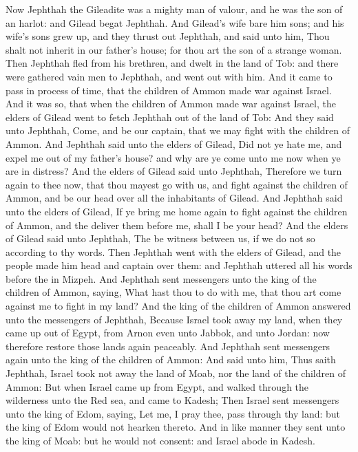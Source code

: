 \begin{biblechapter} %
\verse Now Jephthah the Gileadite was a mighty man of valour, and he was the son of an harlot: and Gilead begat Jephthah.
\verse And Gilead's wife bare him sons; and his wife's sons grew up, and they thrust out Jephthah, and said unto him, Thou shalt not inherit in our father's house; for thou art the son of a strange woman.
\verse Then Jephthah fled from his brethren, and dwelt in the land of Tob: and there were gathered vain men to Jephthah, and went out with him.
\verse And it came to pass in process of time, that the children of Ammon made war against Israel.
\verse And it was so, that when the children of Ammon made war against Israel, the elders of Gilead went to fetch Jephthah out of the land of Tob:
\verse And they said unto Jephthah, Come, and be our captain, that we may fight with the children of Ammon.
\verse And Jephthah said unto the elders of Gilead, Did not ye hate me, and expel me out of my father's house? and why are ye come unto me now when ye are in distress?
\verse And the elders of Gilead said unto Jephthah, Therefore we turn again to thee now, that thou mayest go with us, and fight against the children of Ammon, and be our head over all the inhabitants of Gilead.
\verse And Jephthah said unto the elders of Gilead, If ye bring me home again to fight against the children of Ammon, and the \LORD deliver them before me, shall I be your head?
\verse And the elders of Gilead said unto Jephthah, The \LORD be witness between us, if we do not so according to thy words.
\verse Then Jephthah went with the elders of Gilead, and the people made him head and captain over them: and Jephthah uttered all his words before the \LORD in Mizpeh.
\verse And Jephthah sent messengers unto the king of the children of Ammon, saying, What hast thou to do with me, that thou art come against me to fight in my land?
\verse And the king of the children of Ammon answered unto the messengers of Jephthah, Because Israel took away my land, when they came up out of Egypt, from Arnon even unto Jabbok, and unto Jordan: now therefore restore those lands again peaceably.
\verse And Jephthah sent messengers again unto the king of the children of Ammon:
\verse And said unto him, Thus saith Jephthah, Israel took not away the land of Moab, nor the land of the children of Ammon:
\verse But when Israel came up from Egypt, and walked through the wilderness unto the Red sea, and came to Kadesh;
\verse Then Israel sent messengers unto the king of Edom, saying, Let me, I pray thee, pass through thy land: but the king of Edom would not hearken thereto. And in like manner they sent unto the king of Moab: but he would not consent: and Israel abode in Kadesh.

\end{biblechapter}
